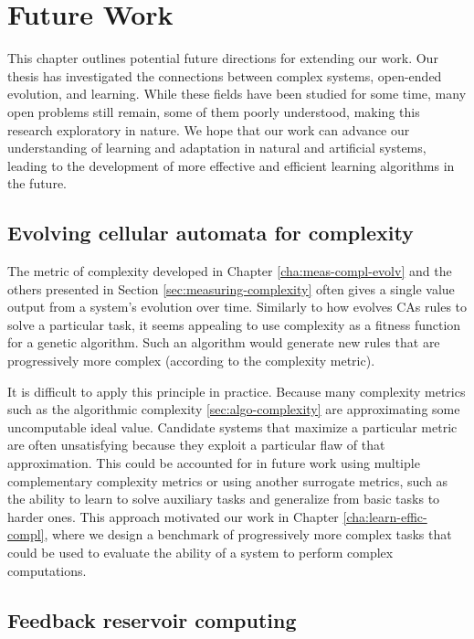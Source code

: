 \chapter{Future Work}\label{cha:future_work}

This chapter outlines potential future directions for extending our work. Our 
thesis has investigated the connections between complex systems, open-ended 
evolution, and learning. While these fields have been studied for some time, 
many open problems still remain, some of them poorly understood, making this research exploratory
in nature. We hope that our work can advance our understanding of learning and
adaptation in natural and artificial systems, leading to the development of more
effective and efficient learning algorithms in the future.

\section{Evolving cellular automata for complexity}

The metric of complexity developed in Chapter \ref{cha:meas-compl-evolv} and the
others presented in Section \ref{sec:measuring-complexity} often gives a single
value output from a system's evolution over time. Similarly to how
\textcite{mitchellEvolvingCellularAutomata1996} evolves \acp{CA} rules to solve
a particular task, it seems appealing to use complexity as a fitness
function for a genetic algorithm. Such an algorithm would generate new rules
that are progressively more complex (according to the complexity metric).

It is difficult to apply this principle in practice. Because many complexity 
metrics such as the algorithmic complexity \ref{sec:algo-complexity} are 
approximating some uncomputable ideal value. Candidate systems that maximize a 
particular metric are often unsatisfying because they exploit a particular flaw 
of that approximation. This could be accounted for in future
work using multiple complementary complexity metrics or using another surrogate
metrics, such as the ability to learn to solve auxiliary tasks and generalize 
from basic tasks to harder ones.
This approach motivated our work in Chapter \ref{cha:learn-effic-compl}, where
we design a benchmark of progressively more complex tasks that could be used to
evaluate the ability of a system to perform complex computations.

\section{Feedback reservoir computing}

